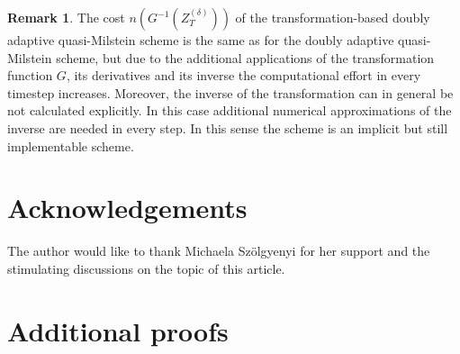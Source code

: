 \documentclass[11pt,a4paper]{article}
\numberwithin{equation}{section}
\theoremstyle{definition}
\newtheorem{remark}[theorem]{Remark}
\begin{document}
\begin{remark}
    The cost $n(G^{-1}(Z^{(\delta)}_T))$ of the transformation-based doubly adaptive quasi-Milstein scheme 
    is the same as for the doubly adaptive quasi-Milstein scheme, 
    but due to the additional applications of the transformation function $G$, its derivatives and its inverse the computational effort in every timestep increases.  Moreover, the inverse of the transformation can in general be not calculated explicitly. In this case additional numerical approximations of the inverse are needed in every step. In this sense the scheme is an implicit but still implementable scheme. 
\end{remark}


\section*{Acknowledgements}
The author would like to thank Michaela Szölgyenyi for her support and the stimulating discussions on the topic of this article.

\appendix

\section{Additional proofs}\label{appendix}
\end{document}
